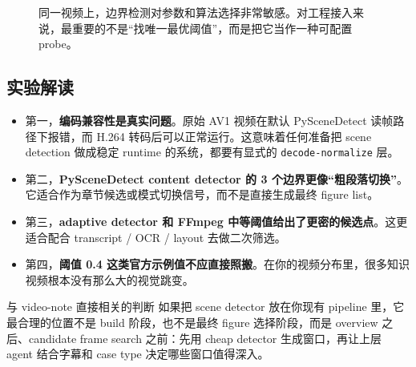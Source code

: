 \documentclass[a4paper]{article}
\begin{document}
\begin{figure}[H]
\centering
{}
\caption{同一视频上，边界检测对参数和算法选择非常敏感。对工程接入来说，最重要的不是“找唯一最优阈值”，而是把它当作一种可配置 probe。}
\end{figure}

\subsection{实验解读}

\begin{itemize}
\item 第一，\textbf{编码兼容性是真实问题}。原始 AV1 视频在默认 PySceneDetect 读帧路径下报错，而 H.264 转码后可以正常运行。这意味着任何准备把 scene detection 做成稳定 runtime 的系统，都要有显式的 \texttt{decode-normalize} 层。
\item 第二，\textbf{PySceneDetect content detector 的 3 个边界更像“粗段落切换”}。它适合作为章节候选或模式切换信号，而不是直接生成最终 figure list。
\item 第三，\textbf{adaptive detector 和 FFmpeg 中等阈值给出了更密的候选点}。这更适合配合 transcript / OCR / layout 去做二次筛选。
\item 第四，\textbf{阈值 0.4 这类官方示例值不应直接照搬}。在你的视频分布里，很多知识视频根本没有那么大的视觉跳变。
\end{itemize}

\begin{findingbox}{与 video-note 直接相关的判断}
如果把 scene detector 放在你现有 pipeline 里，它最合理的位置不是 build 阶段，也不是最终 figure 选择阶段，而是 overview 之后、candidate frame search 之前：先用 cheap detector 生成窗口，再让上层 agent 结合字幕和 case type 决定哪些窗口值得深入。
\end{findingbox}
\end{document}
